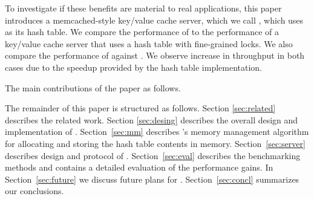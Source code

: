 To investigate if these benefits are material to real applications, this paper introduces a memcached-style key/value cache server, which we call \cpserver{}, which uses \cphash{} as its hash table.  We compare the performance of \cpserver{} to the performance of a key/value cache server that uses a hash table with fine-grained locks. We also compare the performance of \cpserver{} against \memcached{}.  We observe increase in throughput in both cases due to the speedup provided by the \cphash{} hash table implementation.  

The main contributions of the paper as follows. 

The remainder of this paper is structured as follows. Section \ref{sec:related} describes the related work. Section \ref{sec:desing} describes the overall design and implementation of \cphash{}. Section~\ref{sec:mm} describes \cphash{}'s memory management algorithm for allocating and storing the hash table contents in memory. Section~\ref{sec:server} describes design and protocol of \cpserver{}.  Section~\ref{sec:eval} describes the benchmarking methods and contains a detailed evaluation of the performance gains. In Section~\ref{sec:future} we discuss future plans for \cphash{}.  Section~\ref{sec:concl} summarizes our conclusions.

